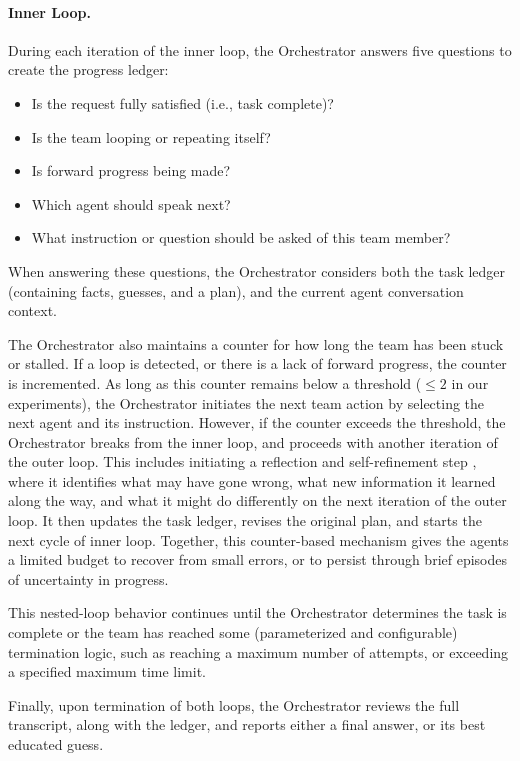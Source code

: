 \paragraph{Inner Loop.} During each iteration of the inner loop, the Orchestrator answers five questions to create the progress ledger:

{\em 
\begin{itemize}
\setlength\itemsep{0em}
\item Is the request fully satisfied (i.e., task complete)?
\item Is the team looping or repeating itself?
\item Is forward progress being made?
\item Which agent should speak next?
\item What instruction or question should be asked of this team member?
\end{itemize}
}

\noindent 
When answering these questions, the Orchestrator considers both the task ledger (containing facts, guesses, and a plan), and the current agent conversation context. 

The Orchestrator also maintains a counter for how long the team has been stuck or stalled. If a loop is detected, or there is a lack of forward progress, the counter is incremented. As long as this counter remains below a threshold ($\leq 2$ in our experiments), the Orchestrator initiates the next team action by selecting the next agent and its instruction.  However, if the counter exceeds the threshold, 
the Orchestrator breaks from the inner loop, and proceeds with another iteration of the outer loop. This includes initiating a reflection and self-refinement step \cite{shinn2024reflexion}, where it identifies what may have gone wrong, what new information it learned along the way, and what it might do differently on the next iteration of the outer loop. It then updates the task ledger, revises the original plan, and starts the next cycle of inner loop. Together, this counter-based mechanism gives the agents a limited budget to recover from small errors, or to persist through brief episodes of uncertainty in progress.

This nested-loop behavior continues until the Orchestrator determines the task is complete or the team has reached some (parameterized and configurable) termination logic, such as reaching a maximum number of attempts, or exceeding a specified maximum time limit. 

Finally, upon termination of both loops, the Orchestrator reviews the full transcript, along with the ledger, and reports either a final answer, or its best educated guess.

